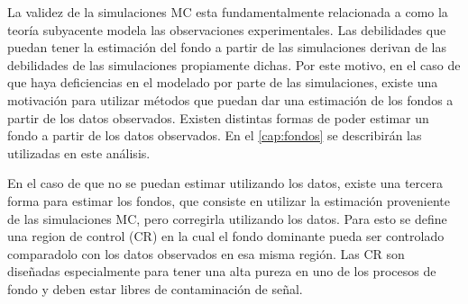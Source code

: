 





La validez de la simulaciones MC esta fundamentalmente relacionada a como la
teoría subyacente modela las observaciones experimentales. Las debilidades que
puedan tener la estimación del fondo a partir de las simulaciones derivan de las
debilidades de las simulaciones propiamente dichas. Por este motivo, en el caso
de que haya deficiencias en el modelado por parte de las simulaciones, existe
una motivación para utilizar métodos que puedan dar una estimación de los fondos
a partir de los datos observados. Existen distintas formas de poder estimar un
fondo a partir de los datos observados. En el \cref{cap:fondos} se
describirán las utilizadas en este análisis.

En el caso de que no se puedan estimar utilizando los datos, existe una tercera
forma para estimar los fondos, que consiste en
utilizar la estimación proveniente de las simulaciones MC, pero corregirla
utilizando los datos. Para esto se define una region de control (CR) en
la cual el fondo dominante pueda ser controlado comparadolo con los datos
observados en esa misma región. Las CR son diseñadas especialmente para tener
una alta pureza en uno de los procesos de fondo y deben estar libres de
contaminación de señal.

